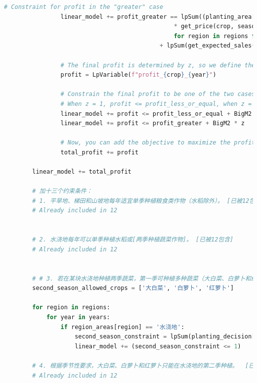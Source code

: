 \documentclass[withoutpreface]{cumcmthesis}
\begin{document}
\begin{appendices}
\begin{lstlisting}[language=python]
                # Constraint for profit in the "greater" case
                linear_model += profit_greater == lpSum((planting_area[(crop, region, year, season)] * get_yield_per_acre(crop, region) - get_expected_sales(crop, season) - get_cost(crop, region))
                                                * get_price(crop, season) * (1 - reduction_factor)
                                                for region in regions for season in seasons) \
                                            + lpSum(get_expected_sales(crop, season) * get_price(crop, season) for season in seasons)
    
                # The final profit is determined by z, so we define the overall profit
                profit = LpVariable(f"profit_{crop}_{year}")
    
                # Constrain the final profit to be one of the two cases
                # When z = 1, profit <= profit_less_or_equal, when z = 0, profit <= profit_greater
                linear_model += profit <= profit_less_or_equal + BigM2 * (1 - z)
                linear_model += profit <= profit_greater + BigM2 * z
    
                # Now, you can add the objective to maximize the profit
                total_profit += profit
    
        linear_model += total_profit
    
        # 加十三个约束条件：
        # 1. 平旱地、梯田和山坡地每年适宜单季种植粮食类作物（水稻除外）。 [已被12包含]
        # Already included in 12
    
    
        # 2. 水浇地每年可以单季种植水稻或[两季种植蔬菜作物]。 [已被12包含]
        # Already included in 12
    
    
        # # 3. 若在某块水浇地种植两季蔬菜，第一季可种植多种蔬菜（大白菜、白萝卜和红萝卜除外）；第二季只能种植大白菜、白萝卜和红萝卜中的一种（便于管理）。
        second_season_allowed_crops = ['大白菜', '白萝卜', '红萝卜']
    
        for region in regions:
            for year in years:
                if region_areas[region] == '水浇地':
                    second_season_constraint = lpSum(planting_decision[(crop, region, year, '第二季')] for crop in second_season_allowed_crops)
                    linear_model += (second_season_constraint <= 1)
    
        # 4. 根据季节性要求，大白菜、白萝卜和红萝卜只能在水浇地的第二季种植。  [已被12包含]
        # Already included in 12      
    

\end{lstlisting}
\end{appendices}
\end{document}
